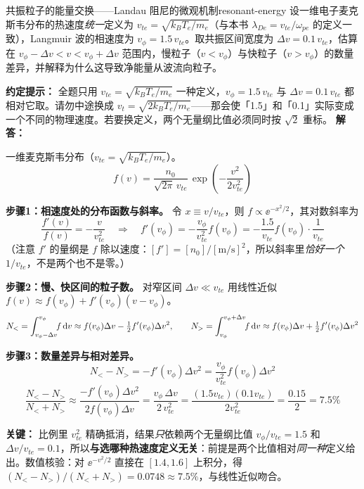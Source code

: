 \begin{example}{共振粒子的能量交换——Landau 阻尼的微观机制}{resonant-energy}
设一维电子麦克斯韦分布的热速度\emph{统一}定义为 $v_{te} = \sqrt{k_{\!B}T_e/m_e}$（与本书 $\lambda_{De}=v_{te}/\omega_{pe}$ 的定义一致），Langmuir 波的相速度为 $v_\phi = 1.5\,v_{te}$。取共振区间宽度为 $\Delta v = 0.1\,v_{te}$，估算在 $v_\phi - \Delta v < v < v_\phi + \Delta v$ 范围内，慢粒子（$v < v_\phi$）与快粒子（$v > v_\phi$）的数量差异，并解释为什么这导致净能量从波流向粒子。

\textbf{约定提示：} 全题只用 $v_{te}=\sqrt{k_{\!B}T_e/m_e}$ 一种定义，$v_\phi=1.5\,v_{te}$ 与 $\Delta v=0.1\,v_{te}$ 都相对它取。请勿中途换成 $v_t=\sqrt{2k_{\!B}T_e/m_e}$——那会使「1.5」和「0.1」实际变成一个不同的物理速度。若要换定义，两个无量纲比值必须同时按 $\sqrt2$ 重标。
\tcblower
\textbf{解答：}

一维麦克斯韦分布（$v_{te}=\sqrt{k_{\!B}T_e/m_e}$）。
\[
f(v) = \frac{n_0}{\sqrt{2\pi}\,v_{te}}\,\exp\!\left(-\frac{v^2}{2v_{te}^2}\right)
\]

\textbf{步骤1：相速度处的分布函数与斜率。} 令 $x\equiv v/v_{te}$，则 $f\propto\ee^{-x^2/2}$，其对数斜率为
\[
\frac{f'(v)}{f(v)} = -\frac{v}{v_{te}^2}
\quad\Rightarrow\quad
f'(v_\phi) = -\frac{v_\phi}{v_{te}^2}f(v_\phi) = -\frac{1.5}{v_{te}}f(v_\phi)\cdot\frac{1}{v_{te}}
\]
（注意 $f'$ 的量纲是 $f$ 除以速度：$[f']=[n_0]/[\mathrm{m/s}]^2$，所以斜率里\emph{恰好一个} $1/v_{te}$，不是两个也不是零。）

\textbf{步骤2：慢、快区间的粒子数。} 对窄区间 $\Delta v\ll v_{te}$ 用线性近似 $f(v)\approx f(v_\phi)+f'(v_\phi)(v-v_\phi)$。
\[
N_{<} = \int_{v_\phi-\Delta v}^{v_\phi}\!\! f\,\mathrm{d} v \approx f(v_\phi)\Delta v - \tfrac12 f'(v_\phi)\Delta v^2,
\qquad
N_{>} = \int_{v_\phi}^{v_\phi+\Delta v}\!\! f\,\mathrm{d} v \approx f(v_\phi)\Delta v + \tfrac12 f'(v_\phi)\Delta v^2
\]

\textbf{步骤3：数量差异与相对差异。}
\[
N_{<}-N_{>} = -f'(v_\phi)\Delta v^2 = \frac{v_\phi}{v_{te}^2}f(v_\phi)\Delta v^2
\]
\[
\frac{N_{<}-N_{>}}{N_{<}+N_{>}} \approx \frac{-f'(v_\phi)\Delta v^2}{2f(v_\phi)\Delta v}
= \frac{v_\phi\,\Delta v}{2\,v_{te}^2}
= \frac{(1.5v_{te})(0.1v_{te})}{2v_{te}^2}
= \frac{0.15}{2} = \boxed{7.5\%}
\]

\textbf{关键：} 比例里 $v_{te}^2$ 精确抵消，结果\emph{只}依赖两个无量纲比值 $v_\phi/v_{te}=1.5$ 和 $\Delta v/v_{te}=0.1$，所以\textbf{与选哪种热速度定义无关}：前提是两个比值相对\emph{同一种}定义给出。数值核验：对 $\ee^{-v^2/2}$ 直接在 $[1.4,1.6]$ 上积分，得 $(N_<-N_>)/(N_<+N_>)=0.0748\approx7.5\%$，与线性近似吻合。


\end{example}
